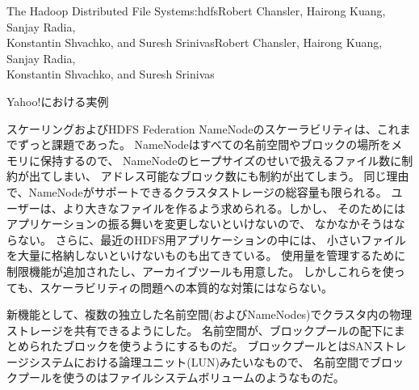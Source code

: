 \begin{aosachaptertoc}{The Hadoop Distributed File System}{s:hdfs}{Robert Chansler, Hairong Kuang, Sanjay Radia, \\ Konstantin Shvachko, and Suresh Srinivas}{Robert Chansler, Hairong Kuang, Sanjay Radia, \\ \hspace*{0.9cm} Konstantin Shvachko, and Suresh Srinivas}
\begin{aosasect1}{Yahoo!における実例}
\begin{aosasect2}{スケーリングおよびHDFS Federation}
NameNodeのスケーラビリティは、これまでずっと課題であった\cite{bib:shvachko:hdfs}。
NameNodeはすべての名前空間やブロックの場所をメモリに保持するので、
NameNodeのヒープサイズのせいで扱えるファイル数に制約が出てしまい、
アドレス可能なブロック数にも制約が出てしまう。
同じ理由で、NameNodeがサポートできるクラスタストレージの総容量も限られる。
ユーザーは、より大きなファイルを作るよう求められる。しかし、
そのためにはアプリケーションの振る舞いを変更しないといけないので、
なかなかそうはならない。
さらに、最近のHDFS用アプリケーションの中には、
小さいファイルを大量に格納しないといけないものも出てきている。
使用量を管理するために制限機能が追加されたし、アーカイブツールも用意した。
しかしこれらを使っても、スケーラビリティの問題への本質的な対策にはならない。

新機能として、複数の独立した名前空間(およびNameNodes)でクラスタ内の物理ストレージを共有できるようにした。
名前空間が、ブロックプールの配下にまとめられたブロックを使うようにするものだ。
ブロックプールとはSANストレージシステムにおける論理ユニット(LUN)みたいなもので、
名前空間でブロックプールを使うのはファイルシステムボリュームのようなものだ。


\end{aosasect2}
\end{aosasect1}
\end{aosachaptertoc}
